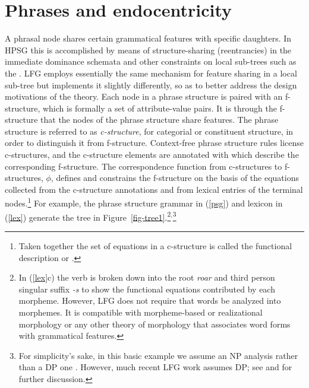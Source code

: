 \section{Phrases and endocentricity} 
A phrasal node shares certain grammatical features with specific daughters. %
In HPSG this is accomplished
by means of structure-sharing (reentrancies) in the immediate dominance schemata and other 
constraints on local sub-trees such as the .  LFG employs essentially the same mechanism for feature sharing in a local sub-tree but implements it slightly differently, so as to better address the design motivations of the theory.  Each node in a phrase structure is paired with an f-structure, which is formally a set of attribute-value pairs.  It is through the f-structure that the nodes of the phrase structure share features.   The phrase structure is referred to as \textit{c-structure}, for categorial or constituent structure, in order to distinguish it from f-structure. 
Context-free phrase structure rules  license c-structures, and the c-structure elements are annotated with  which describe the corresponding f-structure.  
The correspondence function from c-structures to f-structures, $\phi$, defines and constrains the f-structure on the basis of the  equations collected from the c-structure annotations and from lexical entries of the terminal nodes.\footnote{Taken together the set of equations in a c-structure is called the functional description or .}  For example, the phrase structure grammar in (\ref{psg}) and lexicon in (\ref{lex}) generate the tree in Figure~\ref{fig-tree1}.\footnote{In (\ref{lex}c) the verb is broken down into the root \textit{roar} and third person singular suffix \textit{-s} to show the functional equations contributed by each morpheme.  However, LFG does not require that words be analyzed into morphemes.  It is compatible with morpheme-based or realizational morphology or any other theory of morphology that associates word forms with grammatical features.}$^,$\footnote{For simplicity's sake, in this basic example we assume an NP analysis rather than a DP one \citep{Brame82a-u}. However, much recent LFG work assumes DP; see \citet{BATW2016a} and \citet{dalrymple;ea19} for further discussion.}

